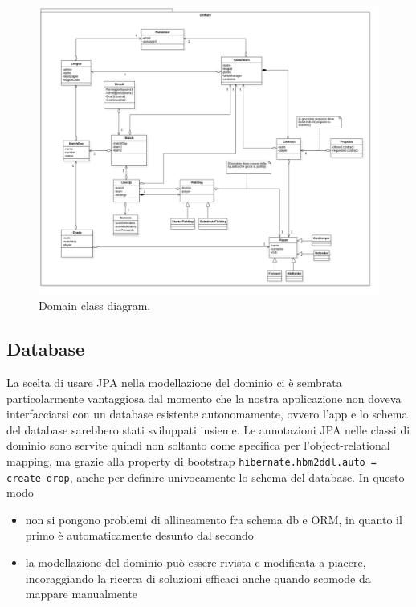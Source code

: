 \begin{figure}
    \centering
    \includegraphics[width=\textwidth]{Resources/graficiUML/ClassDiagramDomain.png}        
    \caption{Domain class diagram.}
    \label{fig:domain_class_diagram}
\end{figure}

\subsection{Database}
La scelta di usare JPA nella modellazione del dominio ci è sembrata particolarmente vantaggiosa
dal momento che la nostra applicazione non doveva interfacciarsi con un database esistente autonomamente,
ovvero l'app e lo schema del database sarebbero stati sviluppati insieme. 
Le annotazioni JPA nelle classi di dominio
sono servite quindi non soltanto come specifica per l'object-relational mapping, ma grazie alla property
di bootstrap \texttt{hibernate.hbm2ddl.auto = create-drop}, anche per definire univocamente lo schema del database.
In questo modo 
\begin{itemize}
    \item non si pongono problemi di allineamento fra schema db e ORM, in quanto il primo
        è automaticamente desunto dal secondo
    \item la modellazione del dominio può essere rivista e modificata a piacere, incoraggiando
        la ricerca di soluzioni efficaci anche quando scomode da mappare manualmente
\end{itemize}

